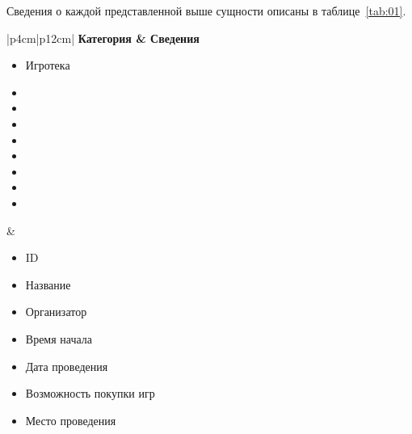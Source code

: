 Сведения о каждой представленной выше сущности описаны в таблице~\ref{tab:01}.

\begin{table}[h!]
    \begin{center}
    \begin{threeparttable}
        \captionsetup{format=hang,justification=raggedright,
                      singlelinecheck=off}
        \caption{\label{tab:01}Категории данных и сведения о них}
        \renewcommand{\arraystretch}{1.5}
        \begin{tabular}{|p{4cm}|p{12cm}|}
            \hline
            \bfseries Категория & \bfseries Сведения\\
            \hline
            \begin{minipage}[t]{\linewidth}
              \begin{multicols}{1}
                \begin{itemize}[labelsep=0mm,nosep,after=\strut]
                  \item[] Игротека
                  \item[]
                  \item[]
                  \item[]
                  \item[]
                  \item[]
                  \item[]
                  \item[]
                  \item[]
                \end{itemize}
              \end{multicols}
            \end{minipage}
          & \begin{minipage}[t]{\linewidth}
              \begin{multicols}{2}
                \begin{itemize}[labelsep=0mm,nosep,after=\strut]
                  \item[] ID
                  \item[] Название
                  \item[] Организатор
                  \item[] Время начала
                  \item[] Дата проведения
                  \item[] Возможность покупки игр
                  \item[] Место проведения

\end{itemize}
\end{multicols}
\end{minipage}
\end{tabular}
\end{threeparttable}
\end{center}
\end{table}
